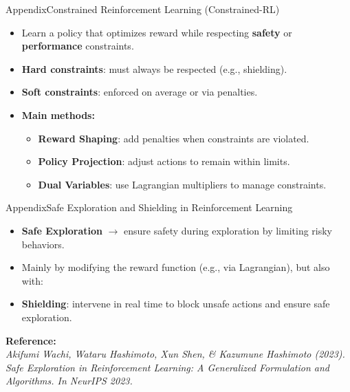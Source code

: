 \begin{frame}{Appendix}{Constrained Reinforcement Learning (Constrained-RL)}

    \begin{itemize}
        \item Learn a policy that optimizes reward while respecting \textbf{safety} or \textbf{performance} constraints.

        \item \textbf{Hard constraints}: must always be respected (e.g., shielding).
        \item \textbf{Soft constraints}: enforced on average or via penalties.

        \item \textbf{Main methods:}
              \begin{itemize}
                  \item \textbf{Reward Shaping}: add penalties when constraints are violated.
                  \item \textbf{Policy Projection}: adjust actions to remain within limits.
                  \item \textbf{Dual Variables}: use Lagrangian multipliers to manage constraints.
              \end{itemize}

    \end{itemize}
\end{frame}

\begin{frame}{Appendix}{Safe Exploration and Shielding in Reinforcement Learning}

    \begin{itemize}
        \item \textbf{Safe Exploration} $\rightarrow$ ensure safety during exploration by limiting risky behaviors.
        \item Mainly by modifying the reward function (e.g., via Lagrangian), but also with:
        \item \textbf{Shielding}: intervene in real time to block unsafe actions and ensure safe exploration.
    \end{itemize}

    \textbf{Reference:} \\
    \textit{Akifumi Wachi, Wataru Hashimoto, Xun Shen, \& Kazumune Hashimoto (2023). Safe Exploration in Reinforcement Learning: A Generalized Formulation and Algorithms. In NeurIPS 2023.}

\end{frame}

